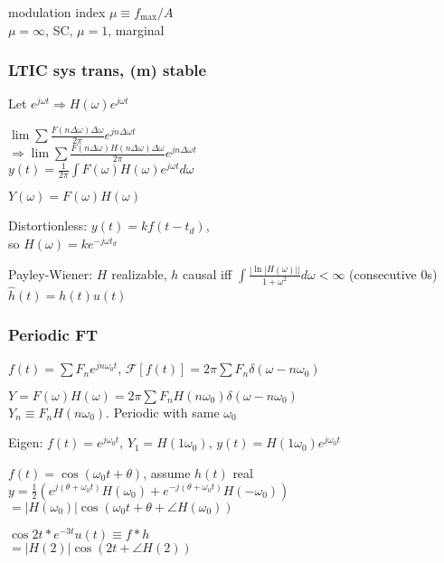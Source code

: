 \documentclass[4pt]{article}
\theoremstyle{definition}
\theoremstyle{definition}
\renewcommand{\o}{\omega}
\begin{document}
    modulation index \(\mu\equiv f_{\text{max}}/A\)\\
    $\mu = \infty$, SC, $\mu = 1$, marginal
\subsubsection{LTIC sys trans, (m) stable}
    Let \(e^{j\o t} \Rightarrow H(\o) e^{j\o t}\)

    \(\lim\sum \frac{F(n\Delta\o)\Delta\o}{2\pi} e^{jn\Delta\o t}\)\\
    \(\Rightarrow \lim\sum \frac{F(n\Delta\o)H(n\Delta\o)\Delta\o}{2\pi} e^{jn\Delta\o t}\)\\
    \(y(t) = \frac{1}{2\pi}\int F(\o)H(\o)e^{j\o t} d\o\)

    \(Y(\o) = F(\o) H(\o)\)

    Distortionless: $y(t) = kf(t-t_d)$,\\
    so $H(\o) = ke^{-j\o t_d}$          %

    Payley-Wiener: $H$ realizable, $h$ causal iff \(\int\frac{|\ln|H(\omega)||}{1+\o^2} d\o < \infty\) (consecutive 0s)\\
    \(\hat{h}(t) = h(t) u(t)\)

\subsubsection{Periodic FT}
    \(f(t) = \sum F_n e^{jn\o_0 t}\), \(\mathcal{F}[f(t)] = 2\pi \sum F_n \delta(\omega - n\o_0)\)      %

    \(Y = F(\omega)H(\omega) = 2\pi \sum F_n H(n\omega_0) \delta(\omega - n\omega_0) \) \\            %
    $Y_n \equiv F_n H(n\o_0)$. Periodic with same $\omega_0$

    Eigen: $f(t) = e^{j\o_0t}$, \(Y_1 = H(1\o_0)\), $y(t) = H(1\o_0) e^{j\o_0 t}$

    $f(t) = \cos(\o_0 t + \theta)$, assume $h(t)$ real\\
    \(y = \frac 1 2 (e^{j(\theta + \o_0 t)}H(\o_0) + e^{-j(\theta + \o_0 t)}H(-\o_0))\)\\          %
    \(=|H(\o_0)| \cos(\o_0t + \theta + \angle H(\o_0))\)

    \(\cos 2t * e^{-3t} u(t) \equiv f * h\)\\       %
    \(=|H(2)| \cos(2t + \angle H(2))\)              %
\end{document}
